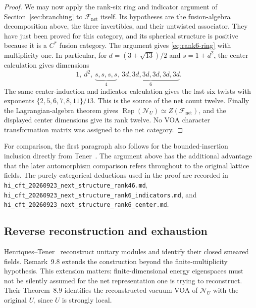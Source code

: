 \documentclass[11pt,a4paper]{article}
\theoremstyle{definition}
\DeclareMathOperator{\Rep}{Rep}
\newcommand{\artifact}[1]{\textnormal{\nolinkurl{#1}}}
\begin{document}
\begin{proof}
We may now apply the rank-six ring and indicator argument of
Section~\ref{sec:branching} to $\mathcal F_{\mathrm{net}}$ itself.
Its hypotheses are the fusion-algebra decomposition above, the three
invertibles, and their untwisted associator.  They have just been
proved for this category, and its spherical structure is positive
because it is a $C^*$ fusion category.  The argument gives
\eqref{eq:rank6-ring} with multiplicity one.  In particular, for
$d=(3+\sqrt{13})/2$ and $s=1+d^2$, the center calculation gives dimensions
\begin{equation}
 1,\ d^2,\ \underbrace{s,s,s,s}_{4},\
 \underbrace{3d,3d,3d,3d,3d,3d}_{6}.
 \label{eq:analytic-center-dimensions}
\end{equation}
The same center-induction and indicator calculation gives the last
six twists with exponents
$\{2,5,6,7,8,11\}/13$.  This is the source of the net count
twelve.  Finally the Lagrangian-algebra theorem gives
$\Rep(\mathcal N_U)\simeq Z(\mathcal F_{\mathrm{net}})$, and the
displayed center dimensions give its rank twelve.  No VOA character
transformation matrix was assigned to the net category.
\end{proof}

For comparison, the first paragraph also follows for the
bounded-insertion inclusion directly from
Tener~\cite[Proposition~5.5 and Theorem~5.6]{TenFields}.  The argument above has the
additional advantage that the later automorphism comparison refers
throughout to the original lattice fields.  The purely categorical
deductions used in the proof are recorded in
\artifact{hi_cft_20260923_next_structure_rank46.md},
\artifact{hi_cft_20260923_next_structure_rank6_indicators.md}, and
\artifact{hi_cft_20260923_next_structure_rank6_center.md}.

\subsection{Reverse reconstruction and exhaustion}
\label{subsec:analytic-reconstruction}

Henriques--Tener~\cite[Theorem~9.5 and Corollary~9.7]{HTNet} reconstruct unitary
modules and identify their closed smeared fields.  Remark~9.8 extends
the construction beyond the finite-multiplicity hypothesis.  This
extension matters: finite-dimensional energy eigenspaces must not be
silently assumed for the net representation one is trying to reconstruct.
Their Theorem~8.9 identifies the reconstructed vacuum VOA of
$\mathcal N_U$ with the original $U$, since $U$ is strongly local.
\end{document}
